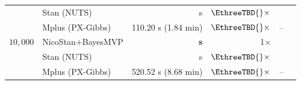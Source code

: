 \begin{table}[H]
{\begin{tabular}{llrrrr}
         & Stan (NUTS)       & \EthreeTBD{} s & $\EthreeTBD{}\times$ & \EthreeTBD{} & \EthreeTBD{} \\
         & Mplus (PX-Gibbs)  & 110.20 s (1.84 min) & $\EthreeTBD{}\times$ & -- & \EthreeTBD{} \\
\midrule
$10,000$ & NicoStan+BayesMVP & \textbf{\EthreeTBD{} s} & 1$\times$ & \EthreeTBD{} & \EthreeTBD{} \\
         & Stan (NUTS)       & \EthreeTBD{} s & $\EthreeTBD{}\times$ & \EthreeTBD{} & \EthreeTBD{} \\
         & Mplus (PX-Gibbs)  & 520.52 s (8.68 min) & $\EthreeTBD{}\times$ & -- & \EthreeTBD{} \\
\bottomrule
\end{tabular}
}
\end{table}
